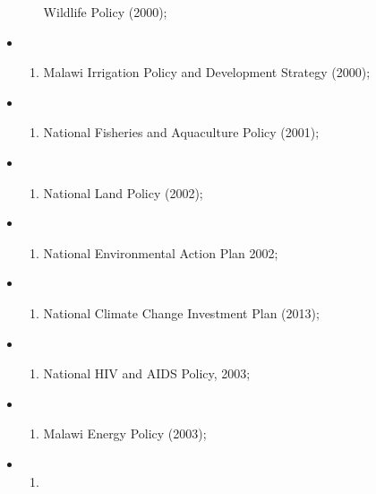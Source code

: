 \documentclass[
]{book}
\providecommand{\tightlist}{%
  \setlength{\itemsep}{0pt}\setlength{\parskip}{0pt}}
\begin{document}
\begin{itemize}
\begin{enumerate}
    Wildlife Policy (2000);
  \end{enumerate}
\item
  \begin{enumerate}
  \def\labelenumi{\roman{enumi}.}
  \setcounter{enumi}{7}
  \tightlist
  \item
    Malawi Irrigation Policy and Development Strategy (2000);
  \end{enumerate}
\item
  \begin{enumerate}
  \def\labelenumi{\roman{enumi}.}
  \setcounter{enumi}{8}
  \tightlist
  \item
    National Fisheries and Aquaculture Policy (2001);
  \end{enumerate}
\item
  \begin{enumerate}
  \def\labelenumi{\alph{enumi}.}
  \setcounter{enumi}{23}
  \tightlist
  \item
    National Land Policy (2002);
  \end{enumerate}
\item
  \begin{enumerate}
  \def\labelenumi{\roman{enumi}.}
  \setcounter{enumi}{10}
  \tightlist
  \item
    National Environmental Action Plan 2002;
  \end{enumerate}
\item
  \begin{enumerate}
  \def\labelenumi{\roman{enumi}.}
  \setcounter{enumi}{11}
  \tightlist
  \item
    National Climate Change Investment Plan (2013);
  \end{enumerate}
\item
  \begin{enumerate}
  \def\labelenumi{\roman{enumi}.}
  \setcounter{enumi}{12}
  \tightlist
  \item
    National HIV and AIDS Policy, 2003;
  \end{enumerate}
\item
  \begin{enumerate}
  \def\labelenumi{\roman{enumi}.}
  \setcounter{enumi}{13}
  \tightlist
  \item
    Malawi Energy Policy (2003);
  \end{enumerate}
\item
  \begin{enumerate}
  \def\labelenumi{\roman{enumi}.}
  \setcounter{enumi}{14}
  \tightlist
  \item

\end{enumerate}
\end{itemize}
\end{document}
